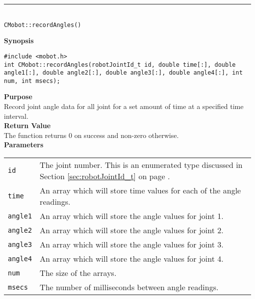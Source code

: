 \noindent
\vspace{5pt}
\rule{4.5in}{0.015in}\\
\noindent
{\LARGE \texttt{CMobot::recordAngles()}}\\
{}

\noindent
{\bf Synopsis}
\vspace{-8pt}
\begin{verbatim}
#include <mobot.h>
int CMobot::recordAngles(robotJointId_t id, double time[:], double angle1[:], double angle2[:], double angle3[:], double angle4[:], int num, int msecs);
\end{verbatim}

\noindent
{\bf Purpose}\\
Record joint angle data for all joint for a set amount of time at a specified time interval.\\

\noindent
{\bf Return Value}\\
The function returns 0 on success and non-zero otherwise.\\

\noindent
{\bf Parameters}\\
\vspace{-0.1in}
\begin{description}
\item               
\begin{tabular}{p{15 mm}p{145 mm}}
\texttt{id} & The joint number. This is an enumerated type 
discussed in Section \ref{sec:robotJointId_t} on page
\pageref{sec:robotJointId_t}.\\
\texttt{time} & An array which will store time values for each of the angle readings. \\
\texttt{angle1} & An array which will store the angle values for joint 1. \\
\texttt{angle2} & An array which will store the angle values for joint 2. \\
\texttt{angle3} & An array which will store the angle values for joint 3. \\
\texttt{angle4} & An array which will store the angle values for joint 4. \\
\texttt{num} & The size of the arrays. \\
\texttt{msecs} & The number of milliseconds between angle readings.
\end{tabular}
\end{description}

